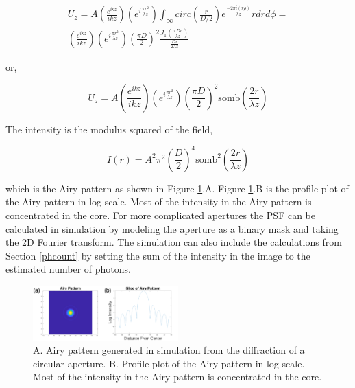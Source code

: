 
\begin{eqnarray}
   U_z=A\left(\frac{e^{ikz}}{ikz}\right)\left(e^{i\frac{\pi r^2}{\lambda z}}\right)\int_{\infty} circ\left(\frac{r}{D/2}\right)e^{\frac{-2\pi i (r \rho )}{\lambda z}}rdrd\phi= \\
   \left(\frac{e^{ikz}}{ikz}\right)\left(e^{i\frac{\pi r^2}{\lambda z}}\right) {\left(\frac{\pi D}{2}\right)}^2 \frac{J_1 (\frac{\pi Dr}{\lambda z})}{\frac{Dr}{2\lambda z}} \nonumber
\end{eqnarray}

\noindent or,

\begin{equation}
    U_z=A \left(\frac{e^{ikz}}{ikz}\right)\left(e^{i\frac{\pi r^2}{\lambda z}}\right) {\left(\frac{\pi D}{2}\right)}^2 \text{somb}\left(\frac{2r}{\lambda z}\right)
\end{equation} 

\noindent The intensity is the modulus squared of the field,

\begin{equation}
    I(r)=A^2 {\pi^2\left(\frac{D}{2}\right)}^4 \text{somb}^2\left(\frac{2r}{\lambda z}\right)
\end{equation}

\noindnet which is the Airy pattern as shown in Figure \ref{fig:Airy}.A. Figure \ref{fig:Airy}.B is the profile plot of the Airy pattern in log scale. Most of the intensity in the Airy pattern is concentrated in the core. For more complicated apertures the PSF can be calculated in simulation by modeling the aperture as a binary mask and taking the 2D Fourier transform. The simulation can also include the calculations from Section \ref{phcount} by setting the sum of the intensity in the image to the estimated number of photons.

\begin{figure}
    \centering
    \includegraphics[width=0.5\textwidth]{Chapter Materials/Chapter Two Materials/airypatterns.png}
    \caption{A. Airy pattern generated in simulation from the diffraction of a circular aperture. B. Profile plot of the Airy pattern in log scale. Most of the intensity in the Airy pattern is concentrated in the core.}
    \label{fig:Airy}
\end{figure}

